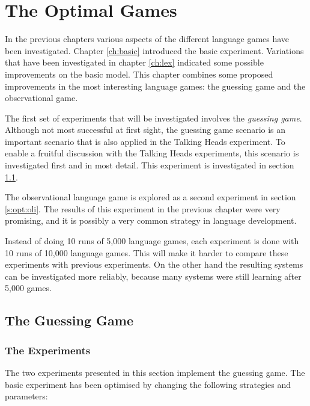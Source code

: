 \chapter{The Optimal Games}\label{ch:opt}

In the previous chapters various aspects of the different language games have been investigated. Chapter \ref{ch:basic} introduced the basic experiment. Variations that have been investigated in chapter \ref{ch:lex} indicated some possible improvements on the basic model. This chapter combines some proposed improvements in the most interesting language games: the guessing game and the observational game.

The first set of experiments that will be investigated involves the {\em guessing game}. Although not most successful at first sight, the guessing game scenario is an important scenario that is also applied in the Talking Heads experiment. To enable a fruitful discussion with the Talking Heads experiments, this scenario is investigated first and in most detail. This experiment is investigated in section \ref{s:opt:gg}.

The observational language game is explored as a second experiment in section \ref{s:opt:oli}. The results of this experiment in the previous chapter were very promising, and it is possibly a very common strategy in language development.


  Instead of doing 10 runs of 5,000 language games, each experiment is done with 10 runs of 10,000 language games. This will make it harder to compare these experiments with previous experiments. On the other hand the resulting systems can be investigated more reliably, because many systems were still learning after 5,000 games. 


\section{The Guessing Game}\label{s:opt:gg}

\subsection{The Experiments}

The two experiments presented in this section implement the guessing game. The basic experiment has been optimised by changing the following strategies and parameters:

